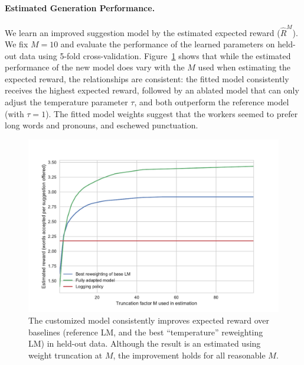\documentclass[11pt,letterpaper]{article}
\begin{document}
%

\paragraph{Estimated Generation Performance.}
We learn an improved suggestion model by the estimated expected reward ($\hat{R}^M$). We fix $M=10$ and evaluate the performance of the learned parameters on held-out data using 5-fold cross-validation. Figure~\ref{fig:est-reward-dataset} shows that while the estimated performance of the new model does vary with the $M$ used when estimating the expected reward, the relationships are consistent: the fitted model consistently receives the highest expected reward, followed by an ablated model that can only adjust the temperature parameter $\tau$, and both outperform the reference model (with $\tau=1$). The fitted model weights {} suggest that the workers seemed to prefer long words and pronouns, and eschewed punctuation.

\begin{figure}
\centering
\includegraphics[trim={0 0.5cm 0 1.5cm},clip,width=0.95\columnwidth]{estimated-reward-fitted-cv}
\caption{\label{fig:est-reward-dataset} The customized model consistently improves expected reward over baselines (reference LM, and the best ``temperature'' reweighting LM) in held-out data. Although the result is an estimated using weight truncation at $M$, the improvement holds for all reasonable $M$. }
%
\end{figure}
\end{document}
